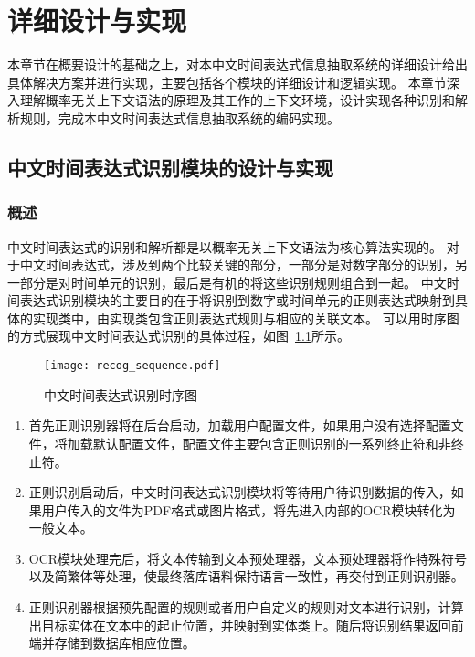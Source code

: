 
\chapter{详细设计与实现}

本章节在概要设计的基础之上，对本中文时间表达式信息抽取系统的详细设计给出具体解决方案并进行实现，主要包括各个模块的详细设计和逻辑实现。
本章节深入理解概率无关上下文语法的原理及其工作的上下文环境，设计实现各种识别和解析规则，完成本中文时间表达式信息抽取系统的编码实现。

\section{中文时间表达式识别模块的设计与实现}

\subsection{概述}

中文时间表达式的识别和解析都是以概率无关上下文语法为核心算法实现的。
对于中文时间表达式，涉及到两个比较关键的部分，一部分是对数字部分的识别，另一部分是对时间单元的识别，最后是有机的将这些识别规则组合到一起。
中文时间表达式识别模块的主要目的在于将识别到数字或时间单元的正则表达式映射到具体的实现类中，由实现类包含正则表达式规则与相应的关联文本。
可以用时序图的方式展现中文时间表达式识别的具体过程，如图~\ref{fig:recog_sequence}所示。

\begin{figure}[h]
    \centering
    \texttt{[image: recog\_sequence.pdf]}
    \caption{中文时间表达式识别时序图}
    \label{fig:recog_sequence}
\end{figure}

\begin{enumerate}
    \item[(1)] 首先正则识别器将在后台启动，加载用户配置文件，如果用户没有选择配置文件，将加载默认配置文件，配置文件主要包含正则识别的一系列终止符和非终止符。
    \item[(2)] 正则识别启动后，中文时间表达式识别模块将等待用户待识别数据的传入，如果用户传入的文件为PDF格式或图片格式，将先进入内部的OCR模块转化为一般文本。
    \item[(3)] OCR模块处理完后，将文本传输到文本预处理器，文本预处理器将作特殊符号以及简繁体等处理，使最终落库语料保持语言一致性，再交付到正则识别器。
    \item[(4)] 正则识别器根据预先配置的规则或者用户自定义的规则对文本进行识别，计算出目标实体在文本中的起止位置，并映射到实体类上。随后将识别结果返回前端并存储到数据库相应位置。
\end{enumerate}

